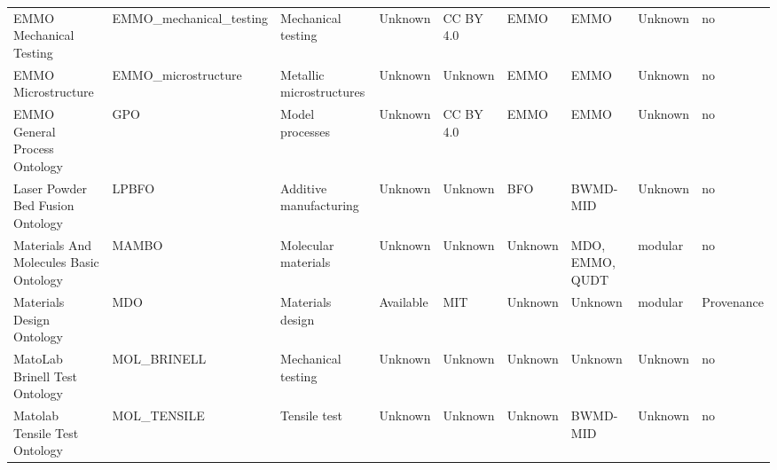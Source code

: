 \begin{tabular}{m{5cm}m{2cm}m{5cm}m{2cm}m{2cm}m{2cm}m{2cm}m{2cm}m{2cm}}
                                                          EMMO Mechanical Testing & EMMO_mechanical_testing &                                                                Mechanical testing &              Unknown &    CC BY 4.0 &                         EMMO &              EMMO &    Unknown &               no \\
                                                              EMMO Microstructure &     EMMO_microstructure &                                                          Metallic microstructures &              Unknown &      Unknown &                         EMMO &              EMMO &    Unknown &               no \\
                                                    EMMO General Process Ontology &                     GPO &                                                                   Model processes &              Unknown &    CC BY 4.0 &                         EMMO &              EMMO &    Unknown &               no \\
                            Laser Powder Bed Fusion Ontology \cite{lpbf_ontology} &                   LPBFO &                                                            Additive manufacturing &              Unknown &      Unknown &                          BFO &          BWMD-MID &    Unknown &               no \\
                     Materials And Molecules Basic Ontology \cite{mambo_ontology} &                   MAMBO &                                                               Molecular materials &              Unknown &      Unknown &                      Unknown &   MDO, EMMO, QUDT &    modular &               no \\
                                             Materials Design Ontology \cite{mdo} &                     MDO &                                                                  Materials design &            Available &         MIT  &                      Unknown &           Unknown &    modular &       Provenance \\
                                                    MatoLab Brinell Test Ontology &             MOL_BRINELL &                                                                Mechanical testing &              Unknown &      Unknown &                      Unknown &           Unknown &    Unknown &               no \\
                                                    Matolab Tensile Test Ontology &             MOL_TENSILE &                                                                      Tensile test &              Unknown &      Unknown &                      Unknown &          BWMD-MID &    Unknown &               no \\

\end{tabular}
